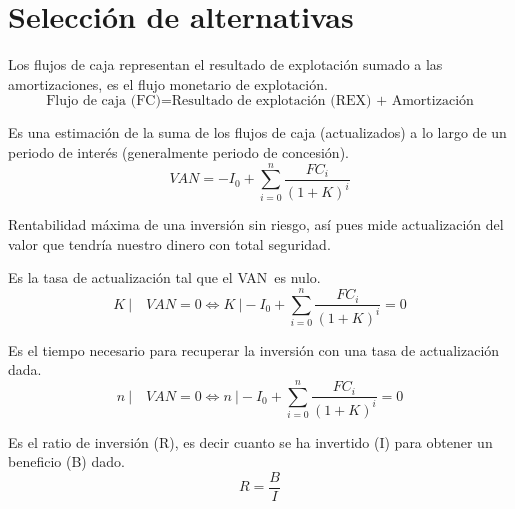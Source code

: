 \section{Selección de alternativas}\label{sec:selection_of_alternatives}

\begin{mydef}
	Los flujos de caja representan el resultado de explotación sumado a las amortizaciones, es el flujo monetario de explotación.
	\[
		\text{Flujo de caja (FC)}= \text{Resultado de explotación (REX) + Amortización}
	\]
\end{mydef}

\begin{mydef}
	Es una estimación de la suma de los flujos de caja (actualizados) a lo largo de un periodo de interés (generalmente periodo de concesión).
	\[
		VAN = -I_0+ \sum_{i=0}^n \frac{FC_i}{(1+K)^i}
	\]
\end{mydef}

\begin{mydef}
	Rentabilidad máxima de una inversión sin riesgo, así pues mide actualización del valor que tendría nuestro dinero con total seguridad.
\end{mydef}

\begin{mydef}
	Es la tasa de actualización tal que el VAN es nulo.
	\[
		K \ | \quad VAN=0 \Leftrightarrow K \ | -I_0+ \sum_{i=0}^n \frac{FC_i}{(1+K)^i}=0
	\]
	
\end{mydef}

\begin{mydef}[Payback]
	Es el tiempo necesario para recuperar la inversión con una tasa de actualización dada.
	\[
		n \ | \quad VAN=0 \Leftrightarrow n \ | -I_0+ \sum_{i=0}^n \frac{FC_i}{(1+K)^i}=0
	\]
\end{mydef}

\begin{mydef}[Rentabilidad]
	Es el ratio de inversión (R), es decir cuanto se ha invertido (I) para obtener un beneficio (B) dado.
	\[
		R= \frac{B}{I}
	\]
\end{mydef}


